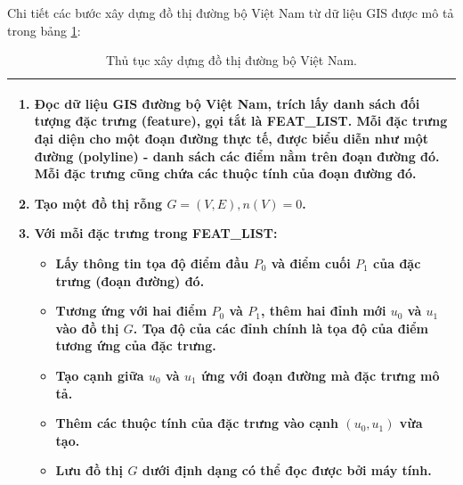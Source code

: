 \documentclass[14pt, oneside, a4paper, openany]{scrartcl}
\begin{document}
Chi tiết các bước xây dựng đồ thị đường bộ Việt Nam từ dữ liệu GIS được mô tả trong bảng \ref{table:graphcreation}:
%
\begin{table}[!h]
	\caption[Thủ tục xây dựng đồ thị đường bộ Việt Nam.]{Thủ tục xây dựng đồ thị đường bộ Việt Nam.}
	\begin{tabular}{ |m{15cm}| } 
		\hline
		\begin{enumerate}
			\item Đọc dữ liệu GIS đường bộ Việt Nam, trích lấy danh sách đối tượng đặc trưng (feature), gọi tắt là \textbf{FEAT\_LIST}. Mỗi đặc trưng đại diện cho một đoạn đường thực tế, được biểu diễn như một đường (polyline) - danh sách các điểm nằm trên đoạn đường đó. Mỗi đặc trưng cũng chứa các thuộc tính của đoạn đường đó.
			\item Tạo một đồ thị rỗng $G = (V,E), n(V) = 0$.
			\item Với mỗi đặc trưng trong \textbf{FEAT\_LIST}:
			\begin{itemize}
				\item Lấy thông tin tọa độ điểm đầu $P_0$ và điểm cuối $P_1$ của đặc trưng (đoạn đường) đó.
				\item Tương ứng với hai điểm $P_0$ và $P_1$, thêm hai đỉnh mới $u_0$ và $u_1$ vào đồ thị $G$. Tọa độ của các đỉnh chính là tọa độ của điểm tương ứng của đặc trưng.
				\item Tạo cạnh giữa $u_0$ và $u_1$ ứng với đoạn đường mà đặc trưng mô tả.
				\item Thêm các thuộc tính của đặc trưng vào cạnh $(u_0,u_1)$ vừa tạo.
				\item Lưu đồ thị $G$ dưới định dạng có thể đọc được bởi máy tính.
			\end{itemize}
		\end{enumerate}
		\\
		\hline
	\end{tabular}
	\label{table:graphcreation}
\end{table}
\end{document}
